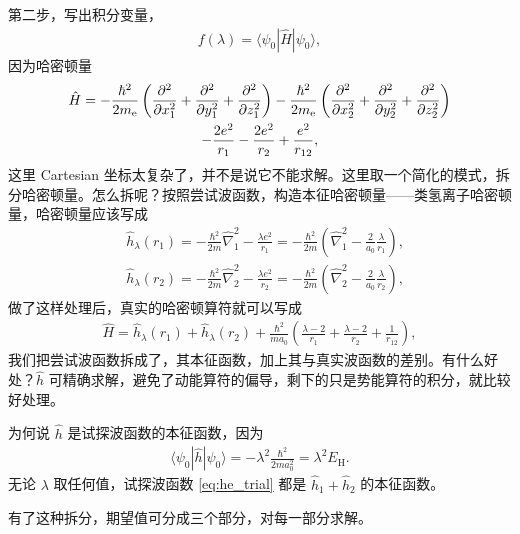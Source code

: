 第二步，写出积分变量，
\begin{align}
    f(\lambda) = \langle \psi_0 | \hat H | \psi_0 \rangle,
\end{align}
因为哈密顿量
\begin{multline}
    \hat H 
    = -\frac{\hbar^2}{2m_\mathrm{e}} \left(\pdv[2]{x_1} + \pdv[2]{y_1} + \pdv[2]{z_1}\right) 
    - \frac{\hbar^2}{2m_\mathrm{e}} \left(\pdv[2]{x_2} + \pdv[2]{y_2} + \pdv[2]{z_2}\right) \\
    - \frac{2e^2}{r_1} - \frac{2e^2}{r_2} + \frac{e^2}{r_{12}},
\end{multline}
这里 Cartesian 坐标太复杂了，并不是说它不能求解。这里取一个简化的模式，拆分哈密顿量。怎么拆呢？按照尝试波函数，构造本征哈密顿量——类氢离子哈密顿量，哈密顿量应该写成
\begin{align}
    &\hat h_\lambda (r_1) = -\frac{\hbar^2}{2m} \hat\nabla_1^2 - \frac{\lambda e^2}{r_1} = -\frac{\hbar^2}{2m} \left(\hat\nabla_1^2 - \frac{2}{a_0}\frac{\lambda}{r_1}\right), \\
    &\hat h_{\lambda}(r_2) = -\frac{\hbar^2}{2m} \hat\nabla_2^2 - \frac{\lambda e^2}{r_2} = -\frac{\hbar^2}{2m} \left(\hat\nabla_2^2 - \frac{2}{a_0}\frac{\lambda}{r_2}\right), 
\end{align}
做了这样处理后，真实的哈密顿算符就可以写成
\begin{align}
    \hat H = \hat h_\lambda (r_1) + \hat h_\lambda (r_2)
    + \frac{\hbar^2}{ma_0} 
    \left(
        \frac{\lambda-2}{r_1} + 
        \frac{\lambda-2}{r_2} + 
        \frac1{r_{12}}
    \right),
\end{align}
我们把尝试波函数拆成了，其本征函数，加上其与真实波函数的差别。有什么好处？$\hat h$ 可精确求解，避免了动能算符的偏导，剩下的只是势能算符的积分，就比较好处理。

为何说 $\hat h$ 是试探波函数的本征函数，因为
\begin{align}
    \langle \psi_0 | \hat h | \psi_0 \rangle = - \lambda^2 \frac{\hbar^2}{2m a_0^2} = \lambda^2 E_{\text{H}}. 
\end{align}
无论 $\lambda$ 取任何值，试探波函数 \eqref{eq:he_trial}
都是 $\hat h_1 + \hat h_2$ 的本征函数。

有了这种拆分，期望值可分成三个部分，对每一部分求解。

